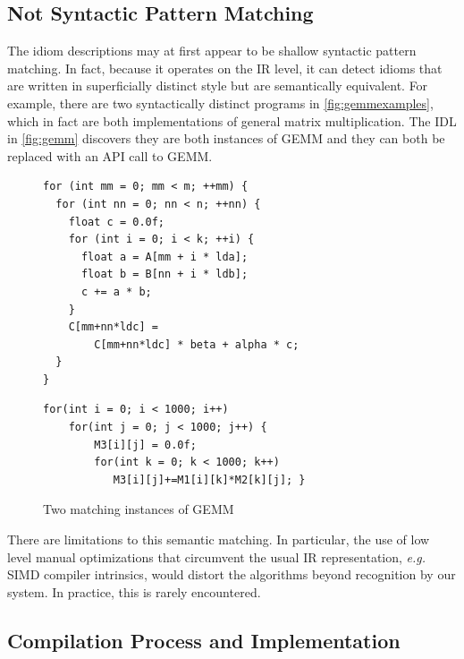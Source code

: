 \subsection{Not Syntactic Pattern Matching}
The idiom descriptions may at first appear to be shallow syntactic pattern matching.
In fact, because it operates on the IR level, it can detect idioms that are written in superficially distinct style but are semantically equivalent.
For example, there are two syntactically distinct programs in \autoref{fig:gemmexamples}, which in fact are both implementations of general matrix multiplication.
The IDL in \autoref{fig:gemm} discovers they are both instances of GEMM and they can both be replaced with an API call to GEMM.

\begin{figure}[ht]
\begin{lstlisting}[numbers=none,basicstyle=\linespread{1.133}\footnotesize\ttfamily]
for (int mm = 0; mm < m; ++mm) {
  for (int nn = 0; nn < n; ++nn) {
    float c = 0.0f;
    for (int i = 0; i < k; ++i) {
      float a = A[mm + i * lda]; 
      float b = B[nn + i * ldb];
      c += a * b;
    }
    C[mm+nn*ldc] =
        C[mm+nn*ldc] * beta + alpha * c;
  }
}
\end{lstlisting}
\vspace{1em}
\begin{lstlisting}[numbers=none,basicstyle=\linespread{1.133}\footnotesize\ttfamily]
for(int i = 0; i < 1000; i++)
    for(int j = 0; j < 1000; j++) {
        M3[i][j] = 0.0f;
        for(int k = 0; k < 1000; k++)
           M3[i][j]+=M1[i][k]*M2[k][j]; }
\end{lstlisting}
\vspace{-0.3cm}
\caption{Two matching instances of GEMM}
\label{fig:gemmexamples}
\end{figure}

    There are limitations to this semantic matching.
    In particular, the use of low level manual optimizations that circumvent the
    usual IR representation, {\em e.g.}  SIMD compiler intrinsics, would distort
    the algorithms beyond recognition by our system.
    In practice, this is rarely encountered.



\subsection{Compilation Process and Implementation}
\label{sec:compilation}

